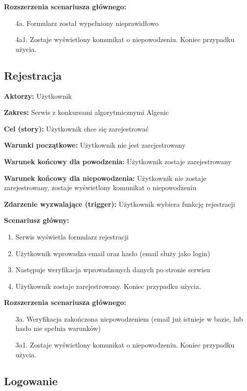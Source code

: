 \documentclass{article}
\begin{document}
\textbf{Rozszerzenia scenariusza głównego:}
\begin{itemize}
	\item[4a.] Formularz został wypełniony nieprawidłowo  
	\item[4a1.] Zostaje wyświetlony komunikat o niepowodzeniu. Koniec przypadku użycia.
\end{itemize}

\newpage
\subsection{Rejestracja}

\textbf{Aktorzy:} Użytkownik

\textbf{Zakres:} Serwis z konkursami algorytmicznymi Algenic

\textbf{Cel (story):} Użytkownik chce się zarejestrować

\textbf{Warunki początkowe:} Użytkownik nie jest zarejestrowany

\textbf{Warunek końcowy dla powodzenia:} Użytkownik zostaje zarejestrowany

\textbf{Warunek końcowy dla niepowodzenia:} Użytkownik nie zostaje zarejestrowany, zostaje wyświetlony komunikat o niepowodzeniu

\textbf{Zdarzenie wyzwalające (trigger):} Użytkownik wybiera funkcję rejestracji

\textbf{Scenariusz główny:}
\begin{enumerate}
	\item Serwis wyświetla formularz rejestracji
	\item Użytkownik wprowadza email oraz hasło (email służy jako login)
	\item Następuje weryfikacja wprowadzonych danych po stronie serwisu
	\item Użytkownik zostaje zarejestrowany. Koniec przypadku użycia.
\end{enumerate}

\textbf{Rozszerzenia scenariusza głównego:}
\begin{itemize}
	\item[3a.] Weryfikacja zakończona niepowodzeniem (email już istnieje w bazie, lub hasło nie spełnia warunków)
	\item[3a1.] Zostaje wyświetlony komunikat o niepowodzeniu. Koniec przypadku użycia.
\end{itemize}

\subsection{Logowanie}
\end{document}
